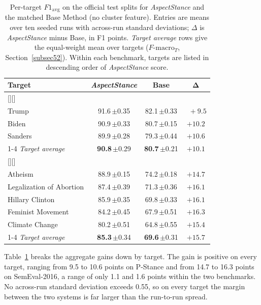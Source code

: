 \documentclass[pdflatex,sn-mathphys-num,iicol]{sn-jnl}%
\makeatletter
\newlength{\bandoverhang}\setlength{\bandoverhang}{0pt}
\newcommand{\bandstrut}{\rule[-0.8ex]{0pt}{3.2ex}}
\newcommand{\tabband}[2]{%
  \rowcolor{snband}[\bandoverhang][\bandoverhang]\multicolumn{#1}{@{}l@{}}{\bandstrut#2}\\}
\newcommand{\sd}[1]{{\fontsize{6.5}{7.5}\selectfont$\pm$#1}}
\makeatother
\begin{document}
\begin{table}[t]
	\caption{Per-target \(F1_{\mathrm{avg}}\) on the official test splits for \textit{AspectStance} and the matched Base Method (no cluster feature). Entries are means over ten seeded runs with across-run standard deviations; \(\Delta\) is \textit{AspectStance} minus Base, in F1 points. \textit{Target average} rows give the equal-weight mean over targets (\(F\text{-}\mathrm{macro}_T\), Section~\ref{subsec52}). Within each benchmark, targets are listed in descending order of \textit{AspectStance} score.}
	\label{tab:pertarget}
	\centering
	\tablebodyfont
	\setlength{\tabcolsep}{1pt}
	\renewcommand{\arraystretch}{1.15}
	\begin{tabular*}{\linewidth}{@{\extracolsep{\fill}}lccc@{}}
		\toprule
		\textbf{Target} & \textbf{\textit{AspectStance}} & \textbf{Base} & $\boldsymbol{\Delta}$ \\
		\midrule
		\tabband{4}{\textsc{P-Stance}}
		Trump                      & 91.6\,\sd{0.35} & 82.1\,\sd{0.33} & $\phantom{0}{+}9.5$ \\
		Biden                      & 90.9\,\sd{0.33} & 80.7\,\sd{0.15} & $+10.2$ \\
		Sanders                    & 89.9\,\sd{0.28} & 79.3\,\sd{0.44} & $+10.6$ \\
		\cmidrule{1-4}
		\textit{Target average} & \textbf{90.8}\,\sd{0.29} & \textbf{80.7}\,\sd{0.21} & $\mathbf{+10.1}$ \\
		\addlinespace[6pt]
		\tabband{4}{\textsc{SemEval-2016 Task~6}}
		Atheism                    & 88.9\,\sd{0.15} & 74.2\,\sd{0.18} & $+14.7$ \\
		Legalization of Abortion   & 87.4\,\sd{0.39} & 71.3\,\sd{0.36} & $+16.1$ \\
		Hillary Clinton            & 85.9\,\sd{0.35} & 69.8\,\sd{0.33} & $+16.1$ \\
		Feminist Movement          & 84.2\,\sd{0.45} & 67.9\,\sd{0.51} & $+16.3$ \\
		Climate Change             & 80.2\,\sd{0.51} & 64.8\,\sd{0.55} & $+15.4$ \\
		\cmidrule{1-4}
		\textit{Target average} & \textbf{85.3}\,\sd{0.34} & \textbf{69.6}\,\sd{0.31} & $\mathbf{+15.7}$ \\
		\bottomrule
	\end{tabular*}
\end{table}

Table~\ref{tab:pertarget} breaks the aggregate gains down by target. The gain is positive on every target, ranging from 9.5 to 10.6 points on P-Stance and from 14.7 to 16.3 points on SemEval-2016, a range of only 1.1 and 1.6 points within the two benchmarks. No across-run standard deviation exceeds 0.55, so on every target the margin between the two systems is far larger than the run-to-run spread.
\end{document}
